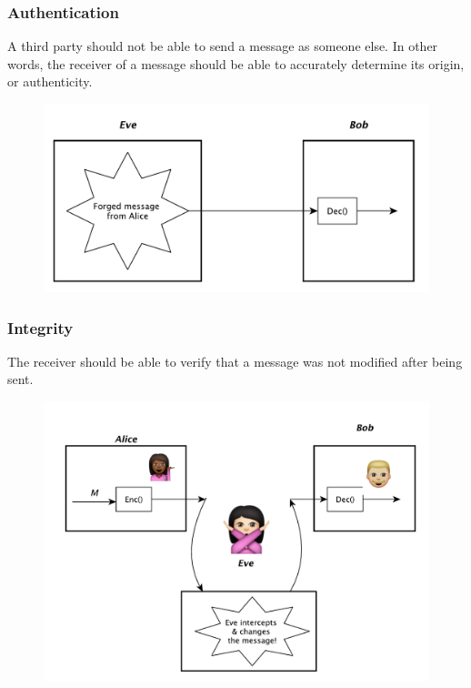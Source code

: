 \documentclass{beamer}
\newcommand{\<}{\langle}
\renewcommand{\>}{\rangle}
\begin{document}
\begin{frame}
\frametitle{Authentication}

A third party should not be able to send a message as someone else. In other words, the receiver of a message should be able to accurately determine its origin, or authenticity. 

\begin{figure}
\includegraphics[scale=.5]{IMG/diag6.pdf}
\end{figure}
\end{frame}


\begin{frame}
\frametitle{Integrity}

The receiver should be able to verify that a message was not modified after being sent. 

\begin{figure}
\includegraphics[scale=.4]{IMG/diag7.pdf}
\end{figure}
\end{frame}
\end{document}
